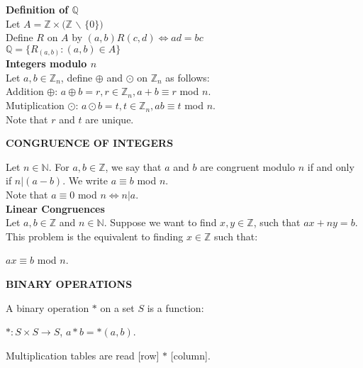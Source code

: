 \documentclass[a4paper]{article}
\begin{document}
\begin{multicols}{2}
\begin{framed}
	\noindent
	\textbf{Definition of $\mathbb{Q}$}\\
	Let $A = \mathbb{Z} \times (\mathbb{Z}$ $\backslash$ $\{0\})$\\
	Define $R$ on $A$ by $(a,b)R(c,d) \Leftrightarrow ad=bc$\\
	$\mathbb{Q}=\{R_{(a,b)} : (a,b) \in A\}$\\
	
	\noindent
	\textbf{Integers modulo $n$}\\
	Let $a, b \in \mathbb{Z}_n$, define $\oplus$ and $\odot$ on $\mathbb{Z}_n$ as follows:\\
	Addition $\oplus$: $a \oplus b = r, r \in \mathbb{Z}_n, a + b \equiv r$ mod $n$.\\
	Mutiplication $\odot$: $a \odot b = t, t \in \mathbb{Z}_n, ab \equiv t$ mod $n$.\\
	Note that $r$ and $t$ are unique.\\
\end{framed}


\begin{framed}
	\begin{center}
		\textbf{\textsc{CONGRUENCE OF INTEGERS}}
	\end{center}
	Let $n \in \mathbb{N}$. For $a, b \in \mathbb{Z}$, we say that $a$ and $b$ are congruent modulo $n$ if and only if $n \vert (a-b)$. We write $a \equiv b$ mod $n$.\\
	Note that $a \equiv 0$ mod $n \Leftrightarrow n \vert a$.\\
	
	\noindent
	\textbf{Linear Congruences}\\
	Let $a,b \in \mathbb{Z}$ and $n \in \mathbb{N}$. Suppose we want to find $x,y \in \mathbb{Z}$, such that $ax + ny = b$. This problem is the equivalent to finding $x \in \mathbb{Z}$ such that:
	\begin{center}
		$ax \equiv b$ mod $n$.
	\end{center}
\end{framed}

\begin{framed}
	\begin{center}
		\textbf{\textsc{BINARY OPERATIONS}}
	\end{center}
	A binary operation $*$ on a set $S$ is a function:
	\begin{center}
		$* : S \times S \rightarrow S$, $a*b = *(a,b)$.
	\end{center}
	Multiplication tables are read [row] $*$ [column].\\
	

\end{framed}
\end{multicols}
\end{document}
